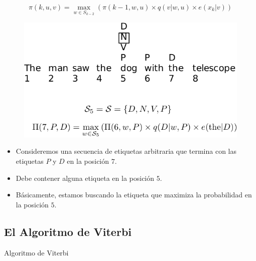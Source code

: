 \[
\pi(k, u, v) = \max_{w \in S_{k-2}} (\pi(k - 1, w, u) \times q(v|w, u) \times e(x_k|v))
\]

\begin{figure}[h]
    \centering
    \includegraphics[scale = 0.6]{pics/viterbi2.pdf}
\end{figure}



\begin{itemize}
    \item Consideremos una secuencia de etiquetas arbitraria que termina con las etiquetas $P$ y $D$ en la posición $7$.
    \item Debe contener alguna etiqueta en la posición $5$.
    \item Básicamente, estamos buscando la etiqueta que maximiza la probabilidad en la posición $5$.
\end{itemize}

\subsection{El Algoritmo de Viterbi}

\begin{algorithm}[H]



\BlankLine
\SetAlgoLined
\caption{Algoritmo de Viterbi}
\label{algo:prob_inference}
\BlankLine


\BlankLine
{}
\end{algorithm}

